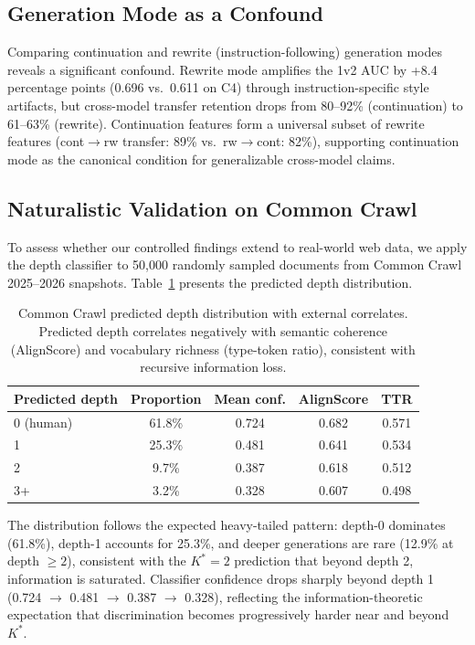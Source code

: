 \documentclass[11pt,a4paper]{article}
\newcommand{\kstar}{K^{*}}
\begin{document}
\subsection{Generation Mode as a Confound}

Comparing continuation and rewrite (instruction-following) generation modes reveals a significant confound.
Rewrite mode amplifies the 1v2 AUC by +8.4 percentage points (0.696 vs.\ 0.611 on C4) through instruction-specific style artifacts, but cross-model transfer retention drops from 80--92\% (continuation) to 61--63\% (rewrite).
Continuation features form a universal subset of rewrite features (cont$\to$rw transfer: 89\% vs.\ rw$\to$cont: 82\%), supporting continuation mode as the canonical condition for generalizable cross-model claims.

\subsection{Naturalistic Validation on Common Crawl}
\label{sec:cc_validation}

To assess whether our controlled findings extend to real-world web data, we apply the depth classifier to 50{,}000 randomly sampled documents from Common Crawl 2025--2026 snapshots.
Table~\ref{tab:cc_depth} presents the predicted depth distribution.

\begin{table}[t]
\centering
\caption{Common Crawl predicted depth distribution with external correlates. Predicted depth correlates negatively with semantic coherence (AlignScore) and vocabulary richness (type-token ratio), consistent with recursive information loss.}
\label{tab:cc_depth}
\small
\begin{tabular}{lcccc}
\toprule
\textbf{Predicted depth} & \textbf{Proportion} & \textbf{Mean conf.} & \textbf{AlignScore} & \textbf{TTR} \\
\midrule
0 (human)  & 61.8\% & 0.724 & 0.682 & 0.571 \\
1          & 25.3\% & 0.481 & 0.641 & 0.534 \\
2          &  9.7\% & 0.387 & 0.618 & 0.512 \\
3+         &  3.2\% & 0.328 & 0.607 & 0.498 \\
\bottomrule
\end{tabular}
\end{table}

The distribution follows the expected heavy-tailed pattern: depth-0 dominates (61.8\%), depth-1 accounts for 25.3\%, and deeper generations are rare (12.9\% at depth $\geq 2$), consistent with the $\kstar\!=\!2$ prediction that beyond depth 2, information is saturated.
Classifier confidence drops sharply beyond depth 1 (0.724 $\to$ 0.481 $\to$ 0.387 $\to$ 0.328), reflecting the information-theoretic expectation that discrimination becomes progressively harder near and beyond $\kstar$.
\end{document}
